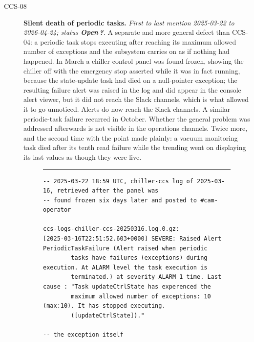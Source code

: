 \begin{description}
\item[CCS-08]\label{iss:CCS-08} \textbf{Silent death of periodic tasks.}
  \emph{First to last mention 2025-03-22 to 2026-04-24; status \textcolor{stopn}{\textbf{Open}}\,\textbf{?}.}
  A separate and more general defect than CCS-04: a periodic task stops executing after reaching its maximum allowed number of exceptions and the subsystem carries on as if nothing had happened.  In March a chiller control panel was found frozen, showing the chiller off with the emergency stop asserted while it was in fact running, because the state-update task had died on a null-pointer exception; the resulting failure alert was raised in the log and did appear in the console alert viewer, but it did not reach the Slack channels, which is what allowed it to go unnoticed.  Alerts do now reach the Slack channels.  A similar periodic-task failure recurred in October.  Whether the general problem was addressed afterwards is not visible in the operations channels.  Twice more, and the second time with the point made plainly: a vacuum monitoring task died after its tenth read failure while the trending went on displaying its last values as though they were live.

\begin{figure}[H]
\centering
\begin{minipage}{\textwidth}
\hrule\vspace{4pt}
\begingroup\scriptsize
\begin{verbatim}
-- 2025-03-22 18:59 UTC, chiller-ccs log of 2025-03-16, retrieved after the panel was
-- found frozen six days later and posted to #cam-operator

ccs-logs-chiller-ccs-20250316.log.0.gz:
[2025-03-16T22:51:52.603+0000] SEVERE: Raised Alert PeriodicTaskFailure (Alert raised when periodic
        tasks have failures (exceptions) during execution. At ALARM level the task execution is
        terminated.) at severity ALARM 1 time. Last cause : "Task updateCtrlState has experenced the
        maximum allowed number of exceptions: 10 (max:10). It has stopped executing.
        ([updateCtrlState])."

-- the exception itself


\end{verbatim}
\end{minipage}
\end{figure}
\end{description}
